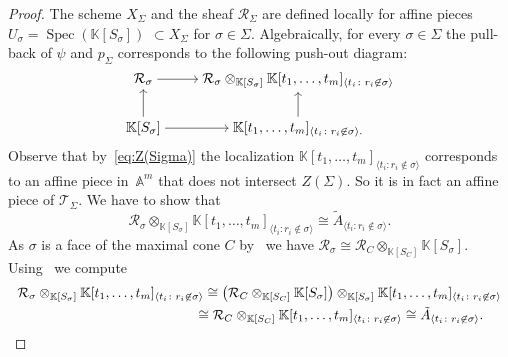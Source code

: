 \documentclass[pdftex]{sigma}%
\numberwithin{equation}{section}
\begin{document}
\begin{proof}
The scheme $X_\Sigma$ and the sheaf $\mathcal R_\Sigma$ are defined locally for affine pieces $U_\sigma=\operatorname{Spec}(\mathbb K[S_\sigma])$ $\subset X_\Sigma$ for $\sigma\in \Sigma$.
Algebraically, for every $\sigma\in \Sigma$ the pull-back of $\psi$ and $p_\Sigma$ corresponds to the following push-out diagram:
 \begin{equation*}%
 \begin{tikzcd}[ampersand replacement=\&,cramped]
 \mathcal R_\sigma\ar[r] \&
 \mathcal R_\sigma\otimes_{\mathbb K[S_\sigma]}\mathbb K[t_1,\dots,t_m]_{\langle t_i\colon r_i\not\in \sigma\rangle } \\
 \mathbb K[S_\sigma] \ar[r]\ar[u]\& \mathbb K[t_1,\dots,t_m]_{\langle t_i\colon r_i\not\in \sigma\rangle . } \ar[u]
 \end{tikzcd}
 \end{equation*}
Observe that by~\eqref{eq:Z(Sigma)} the localization $\mathbb K[t_1,\dots,t_m]_{\langle t_i\colon r_i\not\in \sigma\rangle }$ corresponds to an affine piece in~$\mathbb A^m$ that does not intersect $Z(\Sigma)$.
So it is in fact an affine piece of $\mathcal T_\Sigma$.
We have to show that
\begin{displaymath}
\mathcal R_\sigma\otimes_{\mathbb K[S_\sigma]}\mathbb K[t_1,\dots,t_m]_{\langle t_i\colon r_i\not\in \sigma\rangle } \cong \tilde A_{\langle t_i\colon r_i\not\in \sigma\rangle}.
\end{displaymath}
As $\sigma$ is a face of the maximal cone $C$ by~\cite[Proposition 3.13]{KM-toricbundles} we have $\mathcal R_\sigma\cong \mathcal R_C\otimes_{\mathbb K[S_C]}\mathbb K[S_\sigma]$.
Using~ we compute
\begin{gather*}
\mathcal R_\sigma\otimes_{\mathbb K[S_\sigma]}\mathbb K[t_1,\dots,t_m]_{\langle t_i\colon r_i\not\in \sigma\rangle}
\cong
\big(\mathcal R_C\otimes_{\mathbb K[S_C]}\mathbb K[S_\sigma]\big)\otimes_{\mathbb K[S_\sigma]}\mathbb K[t_1,\dots,t_m]_{\langle t_i\colon r_i\not\in \sigma\rangle}
\\ \hphantom{\mathcal R_\sigma\otimes_{\mathbb K[S_\sigma]}\mathbb K[t_1,\dots,t_m]_{\langle t_i\colon r_i\not\in \sigma\rangle}}
{}\cong\mathcal R_C\otimes_{\mathbb K[S_C]}\mathbb K[t_1,\dots,t_m]_{\langle t_i\colon r_i\not\in \sigma\rangle}\cong \tilde A_{\langle t_i\colon r_i\not\in \sigma\rangle}.\tag*{\qed}
\end{gather*}
\renewcommand{\qed}{}
\end{proof}
\end{document}
